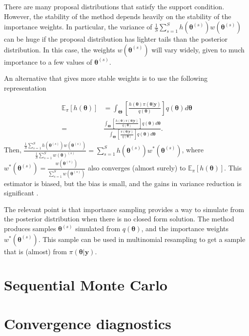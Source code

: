 There are many proposal distributions that satisfy the support condition. However, the stability of the method depends heavily on the stability of the importance weights. In particular, the variance of $\frac{1}{S}\sum_{s=1}^S h(\bm{\theta}^{(s)})w(\bm{\theta}^{(s)})$ can be huge if the proposal distribution has lighter tails than the posterior distribution. In this case, the weights $w(\bm{\theta}^{(s)})$ will vary widely, given to much importance to a few values of $\bm{\theta}^{(s)}$.

An alternative that gives more stable weights is to use the following representation

\begin{align}\label{eq5_4}
	\mathbb{E}_{\pi}[h(\bm{\theta})]&=\int_{\bm{\Theta}} \left[\frac{h(\bm{\theta}) \pi(\bm{\theta}|\bm{y})}{q(\bm{\theta})}\right]q(\bm{\theta})d\bm{\theta}\\
	=&\frac{\int_{\bm{\Theta}}\left[\frac{h(\bm{\theta}) \pi(\bm{\theta}|\bm{y})}{q(\bm{\theta})}\right] q(\bm{\theta})d\bm{\theta}}{\int_{\bm{\Theta}}\left[\frac{ \pi(\bm{\theta}|\bm{y})}{q(\bm{\theta})}\right] q(\bm{\theta})d\bm{\theta}}.
\end{align}
Then, $\frac{\frac{1}{S}\sum_{s=1}^Sh(\bm{\theta}^{(s)})w(\bm{\theta}^{(s)})}{\frac{1}{S}\sum_{s=1}^Sw(\bm{\theta})^{(s)}}= \sum_{s=1}^S h(\bm{\theta}^{(s)})w^*(\bm{\theta}^{(s)})$, where $w^*(\bm{\theta}^{(s)})=\frac{w(\bm{\theta}^{(s)})}{\sum_{s=1}^Sw(\bm{\theta}^{(s)})}$ also converges (almost surely) to $\mathbb{E}_{\pi}[h(\bm{\theta})]$. This estimator is biased, but the bias is small, and the gains in variance reduction is significant \cite[Chap.~3]{robert2011monte}.

The relevant point is that importance sampling provides a way to simulate from the posterior distribution when there is no closed form solution. The method produces samples $\bm{\theta}^{(s)}$ simulated from $q(\bm{\theta})$, and the importance weights $w^*(\bm{\theta}^{(s)})$. This sample can be used in multinomial resampling to get a sample that is (almost) from $\pi(\bm{\theta}|\bm{y})$.

\section{Sequential Monte Carlo}\label{sec53}

\section{Convergence diagnostics}\label{sec54}

